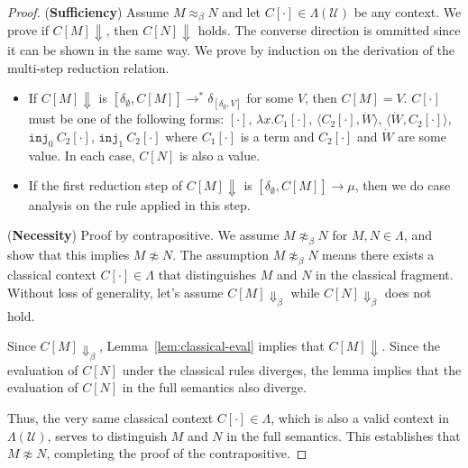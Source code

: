 \ConservTheorem*
\begin{proof}[Proof]
  (\textbf{Sufficiency})
  Assume $M\approx_\beta N$ and let $C[\cdot] \in \Lambda(\mathcal{U})$ be any context.
  We prove if $C[M] \Downarrow$, then $C[N] \Downarrow$ holds.
  The converse direction is ommitted since it can be shown in the same way.
  We prove by induction on the derivation of the multi-step reduction relation.
  \begin{itemize}
    \item If $C[M] \Downarrow$ is $[\delta_\emptyset, C[M]] \longrightarrow^* \delta_{[\delta_\emptyset,V]}$ for some $V$, then $C[M] = V$.
          $C[\cdot]$ must be one of the following forms: $[\cdot]$, $\lambda x.C_1[\cdot]$, $\langle C_2[\cdot], \dot{W}\rangle$, $\langle \dot{W}, C_2[\cdot]\rangle$, $\texttt{inj}_0\ C_2[\cdot]$, $\texttt{inj}_1\ C_2[\cdot]$ where $C_1[\cdot]$ is a term and $C_2[\cdot]$ and $\dot{W}$ are some value.
          In each case, $C[N]$ is also a value.
    \item If the first reduction step of $C[M] \Downarrow$ is $[\delta_\emptyset, C[M]] \longrightarrow \mu$, then we do case analysis on the rule applied in this step.
  \end{itemize}
  (\textbf{Necessity})
  Proof by contrapositive.
  We assume $M \not\approx_{\beta} N$ for $M, N \in \Lambda$, and show that this implies $M \not\approx N$.
  The assumption $M \not\approx_{\beta} N$ means there exists a classical context $C[\cdot] \in \Lambda$ that distinguishes $M$ and $N$ in the classical fragment.
  Without loss of generality, let's assume $C[M] \Downarrow_\beta$ while $C[N] \Downarrow_\beta$ does not hold.

  Since $C[M] \Downarrow_\beta$, Lemma~\ref{lem:classical-eval} implies that $C[M] \Downarrow$.
  Since the evaluation of $C[N]$ under the classical rules diverges, the lemma implies that the evaluation of $C[N]$ in the full semantics also diverge.

  Thus, the very same classical context $C[\cdot] \in \Lambda$, which is also a valid context in $\Lambda(\mathcal{U})$, serves to distinguish $M$ and $N$ in the full semantics.
  This establishes that $M \not\approx N$, completing the proof of the contrapositive.
\end{proof}